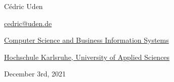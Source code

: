 \begin{center}
    

\vspace*{3mm}


\vspace*{16mm}

{\Large Cédric Uden}

\vspace*{2mm}

{\large\href{mailto:cedric@uden.de}{cedric@uden.de}}

\vspace*{6mm}

{\large\href{https://www.h-ka.de/en/about-hka/faculties/computer-science-and-business-information-systems/overview}{Computer Science and Business Information Systems}}

{\large\href{https://www.h-ka.de/en/}{Hochschule Karlsruhe, University of Applied Sciences}}

\vspace*{12mm}

\ifprintsvg

\fi

\vspace*{12mm}

{\large December 3rd, 2021}

\vspace*{12mm}

\end{center}
